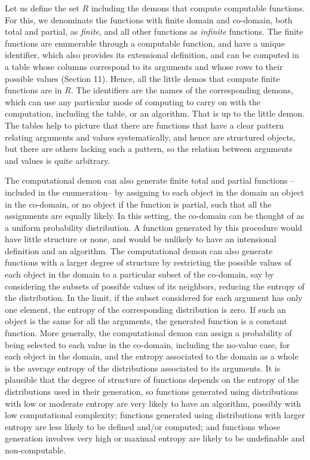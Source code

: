 \documentclass[11pt]{article}
\begin{document}
Let us define the set $R$ including the demons that compute computable functions. For this, we denominate the functions with finite domain and co-domain, both total and partial, as \emph{finite}, and all other functions as \emph{infinite} functions. The finite functions are enumerable through a computable function, and have a unique identifier, which also provides its extensional definition, and can be computed in a table whose columns correspond to its arguments and whose rows to their possible values \cite{Pineda-2024} (Section 11). Hence, all the little demos that compute finite functions are in $R$. The identifiers are the names of the corresponding demons, which can use any particular mode of computing to carry on with the computation, including the table, or an algorithm. That is up to the little demon. The tables help to picture that there are functions that have a clear pattern relating arguments and values systematically, and hence are structured objects, but there are others lacking such a pattern, so the relation between arguments and values is quite arbitrary.

The computational demon can also generate finite total and partial functions --included in the enumeration-- by assigning to each object in the domain an object in the co-domain, or no object if the function is partial, such that all the assignments are equally likely. In this setting, the co-domain can be thought of as a uniform probability distribution. A function generated by this procedure would have little structure or none, and would be unlikely to have an intensional definition and an algorithm. The computational demon can also generate functions with a larger degree of structure by restricting the possible values of each object in the domain to a particular subset of the co-domain, say by considering the subsets of possible values of its neighbors, reducing the entropy of the distribution. In the limit, if the subset considered for each argument has only one element, the entropy of the corresponding distribution is zero. If such an object is the same for all the arguments, the generated function is a constant function. More generally, the computational demon can assign a probability of being selected to each value in the co-domain, including the no-value case, for each object in the domain, and the entropy associated to the domain as a whole is the average entropy of the distributions associated to its arguments. It is plausible that the degree of structure of functions depends on the entropy of the distributions used in their generation, so functions generated using distributions with low or moderate entropy are very likely to have an algorithm, possibly with low computational complexity; functions generated using distributions with larger entropy are less likely to be defined and/or computed; and functions whose generation involves very high or maximal entropy are likely to be undefinable and non-computable.
\end{document}
